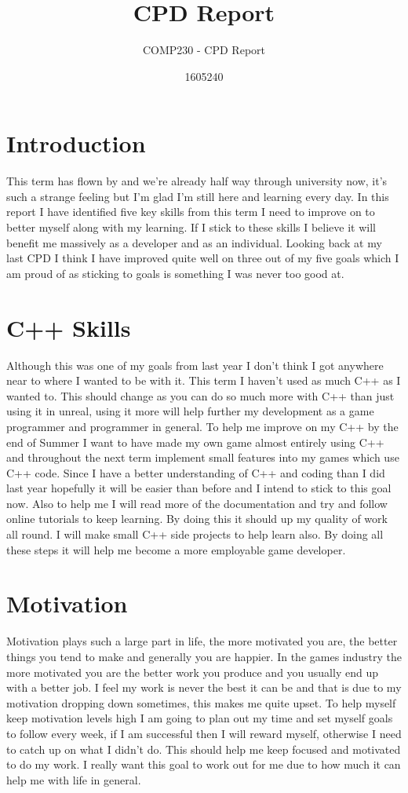 \documentclass{scrartcl}
\title{CPD Report}
\subtitle{COMP230 - CPD Report}
\author{1605240}
\begin{document}
\maketitle

\section*{Introduction}
This term has flown by and we're already half way through university now, it's such a strange feeling but I'm glad I'm still here and learning every day. In this report I have identified five key skills from this term I need to improve on to better myself along with my learning. If I stick to these skills I believe it will benefit me massively as a developer and as an individual. Looking back at my last CPD I think I have improved quite well on three out of my five goals which I am proud of as sticking to goals is something I was never too good at.

\section{C++ Skills}
Although this was one of my goals from last year I don't think I got anywhere near to where I wanted to be with it. This term I haven't used as much C++ as I wanted to. This should change as you can do so much more with C++ than just using it in unreal, using it more will help further my development as a game programmer and programmer in general. To help me improve on my C++ by the end of Summer I want to have made my own game almost entirely using C++ and throughout the next term implement small features into my games which use C++ code. Since I have a better understanding of C++ and coding than I did last year hopefully it will be easier than before and I intend to stick to this goal now. Also to help me I will read more of the documentation and try and follow online tutorials to keep learning. By doing this it should up my quality of work all round. I will make small C++ side projects to help learn also. By doing all these steps it will help me become a more employable game developer.


\section{Motivation}
Motivation plays such a large part in life, the more motivated you are, the better things you tend to make and generally you are happier. In the games industry the more motivated you are the better work you produce and you usually end up with a better job. I feel my work is never the best it can be and that is due to my motivation dropping down sometimes, this makes me quite upset. To help myself keep motivation levels high I am going to plan out my time and set myself goals to follow every week, if I am successful then I will reward myself, otherwise I need to catch up on what I didn't do. This should help me keep focused and motivated to do my work. I really want this goal to work out for me due to how much it can help me with life in general.
\end{document}

